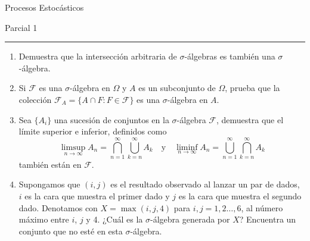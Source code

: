 \documentclass{report}
\begin{document}
\pagestyle{empty}
\begin{center}
    \textsf{\Large Procesos Estocásticos}
    \par\medskip
    \textsf{\large Parcial 1}
\end{center}
\hrule
\par\bigskip

\begin{enumerate}
    \item Demuestra que la intersección arbitraria de $\sigma$-álgebras es también una $\sigma$-álgebra.
    \item Si $\mathcal{F}$ es una $\sigma$-álgebra en $\Omega$ y $A$ es un subconjunto de $\Omega$, prueba que la colección $\mathcal{F}_A = \{A \cap F : F \in \mathcal{F}\}$ es una $\sigma$-álgebra en $A$.
    \item Sea $\{A_i\}$ una sucesión de conjuntos en la $\sigma$-álgebra $\mathcal{F}$, demuestra que el límite superior e inferior, definidos como 
    $$
        \limsup_{n\rightarrow \infty}A_n = \bigcap_{n=1}^\infty\bigcup_{k=n}^\infty A_k \quad\text{y}\quad \liminf_{n\rightarrow \infty} A_n =      \bigcup_{n=1}^{\infty}\bigcap_{k=n}^\infty A_k
    $$
    también están en $\mathcal{F}$.
    \item Supongamos que $(i,j)$ es el resultado observado al lanzar un par de dados, $i$ es la cara que muestra el primer dado y $j$ es la cara que muestra el segundo dado. Denotamos con $X = \max(i,j,4)$ para $i,j=1,2\ldots,6$, al número máximo entre $i$, $j$ y 4. ¿Cuál es la $\sigma$-álgebra generada por $X$? Encuentra un conjunto que no esté en esta $\sigma$-álgebra.

\end{enumerate}
\end{document}
